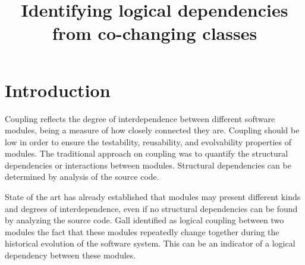 \documentclass[a4paper,twoside]{article}
\begin{document}
\title{Identifying logical dependencies from co-changing classes}


\author{ %
}





\onecolumn \maketitle \normalsize \setcounter{footnote}{0} \vfill



\section{Introduction}
\label{sec:intro}

Coupling reflects the degree of interdependence between different software modules, being a measure of how closely connected they are. Coupling should be low in order to ensure the testability, reusability, and evolvability properties of modules.  The traditional approach on coupling was to quantify the structural dependencies or interactions between modules. Structural dependencies can be determined by analysis of the source code.
   
State of the art has already established that modules may present different kinds and degrees of interdependence, even if no structural dependencies can be found by analyzing the source code. Gall \cite{Gall:1998:DLC:850947.853338} identified as logical coupling between two modules the fact that these modules repeatedly change together during the historical evolution of the software system. This can be an indicator of a logical dependency between these modules.
\end{document}
